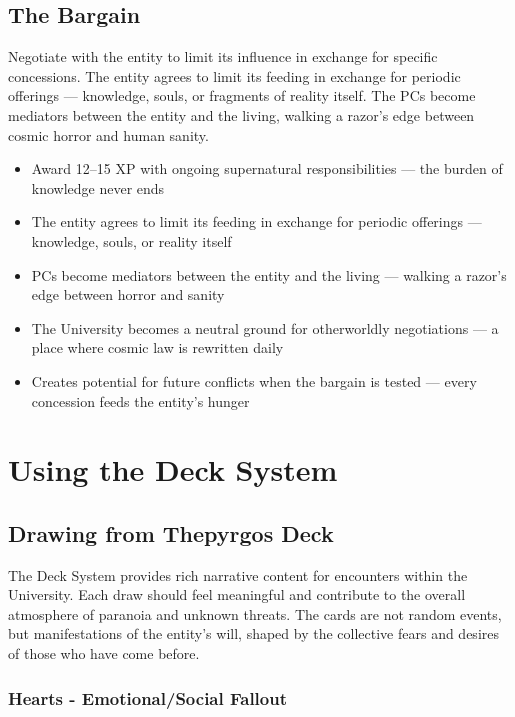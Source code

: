 \documentclass[11pt]{article}
\begin{document}
\subsection{The Bargain}

Negotiate with the entity to limit its influence in exchange for specific concessions. The entity agrees to limit its feeding in exchange for periodic offerings --- knowledge, souls, or fragments of reality itself. The PCs become mediators between the entity and the living, walking a razor's edge between cosmic horror and human sanity.

\begin{itemize}
\item Award 12--15 XP with ongoing supernatural responsibilities --- the burden of knowledge never ends
\item The entity agrees to limit its feeding in exchange for periodic offerings --- knowledge, souls, or reality itself
\item PCs become mediators between the entity and the living --- walking a razor's edge between horror and sanity
\item The University becomes a neutral ground for otherworldly negotiations --- a place where cosmic law is rewritten daily
\item Creates potential for future conflicts when the bargain is tested --- every concession feeds the entity's hunger
\end{itemize}

\section{Using the Deck System}

\subsection{Drawing from Thepyrgos Deck}

The Deck System provides rich narrative content for encounters within the University. Each draw should feel meaningful and contribute to the overall atmosphere of paranoia and unknown threats. The cards are not random events, but manifestations of the entity's will, shaped by the collective fears and desires of those who have come before.

\subsubsection{Hearts - Emotional/Social Fallout}
\end{document}
